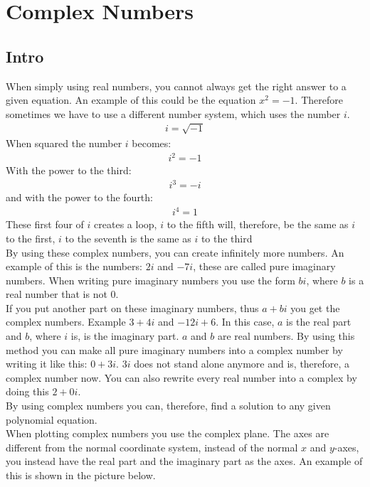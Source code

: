 \chapter{Complex Numbers}
\section{Intro}
When simply using real numbers, you cannot always get the right answer to a given equation. An example of this could be the equation $x^2=-1$. Therefore sometimes we have to use a different number system, which uses the number $i$. 
\begin{align*}
i=\sqrt{-1}
\end{align*}
When squared the number $i$ becomes:
\begin{align*}
i^2=-1
\end{align*}
With the power to the third:
\begin{align*}
i^3=-i
\end{align*}
and with the power to the fourth:
\begin{align*}
i^4=1
\end{align*}
These first four of $i$ creates a loop, $i$ to the fifth will, therefore, be the same as $i$ to the first, $i$ to the seventh is the same as $i$ to the third \\
By using these complex numbers, you can create infinitely more numbers.  
An example of this is the numbers: $2i$ and $-7i$, these are called pure imaginary numbers. When writing pure imaginary numbers you use the form $bi$, where $b$ is a real number that is not $0$. \\
If you put another part on these imaginary numbers, thus $a+bi$ you get the complex numbers. Example $3+4i$ and $-12i+6$. In this case, $a$ is the real part and $b$, where $i$ is, is the imaginary part. $a$ and $b$ are real numbers. By using this method you can make all pure imaginary numbers into a complex number by writing it like this: $0+3i$. $3i$ does not stand alone anymore and is, therefore, a complex number now. You can also rewrite every real number into a complex by doing this $2+0i$. \\
By using complex numbers you can, therefore, find a solution to any given polynomial equation. \\ 
When plotting complex numbers you use the complex plane. The axes are different from the normal coordinate system, instead of the normal $x$ and $y$-axes, you instead have the real part and the imaginary part as the axes. An example of this is shown in the picture below.



